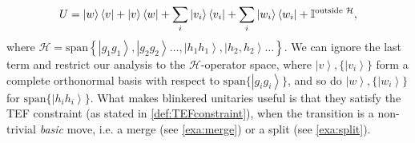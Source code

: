 \documentclass{article}
\begin{document}
\begin{displaymath}
  U=\left|w\right\rangle \left\langle v\right|+\left|v\right\rangle \left\langle w\right|+\sum_{i}\left|v_{i}\right\rangle \left\langle v_{i}\right|+\sum_{i}\left|w_{i}\right\rangle \left\langle w_{i}\right|+\mathbb{I}^{\text{outside }\text{\ensuremath{\mathcal{H}}}},
\end{displaymath}
where $\mathcal{H}=\text{span}\left\{ \left|g_{1}g_{1}\right\rangle ,\left|g_{2}g_{2}\right\rangle \dots,\left|h_{1}h_{1}\right\rangle ,\left|h_{2},h_{2}\right\rangle \dots\right\} $.
We can ignore the last term and restrict our analysis
to the $\mathcal{H}$-operator space, where $\left|v\right\rangle ,\{\left|v_{i}\right\rangle \}$
form a complete orthonormal basis with respect to $\text{span}\{\left|g_{i}g_{i}\right\rangle \}$, and so do $\left|w\right\rangle ,\{\left|w_{i}\right\rangle \}$
for $\text{span}\{\left|h_{i}h_{i}\right\rangle \}$.
What makes blinkered unitaries useful is that they satisfy the TEF constraint (as stated in \cref{def:TEFconstraint}), when the transition is a non-trivial \emph{basic} move, i.e. a merge (see \cref{exa:merge}) or a split (see \cref{exa:split}).
%
%
\end{document}
